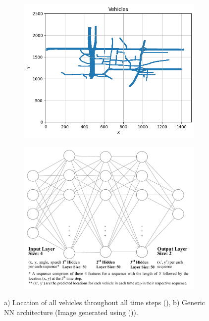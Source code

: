 \documentclass[journal,onecolumn]{IEEEtran}
\begin{document}
{\begin{appendices}
\begin{figure}[H]
    \centering
    \begin{subfigure}[b]{0.46\linewidth}
        \centering
        \includegraphics[width=\linewidth]{figures/location.png}
        \caption{}
        \label{fig:location}
    \end{subfigure}%
    \begin{subfigure}[b]{0.54\linewidth}
        \centering
        \includegraphics[width=\linewidth]{figures/architecture.pdf}
        \caption{}
        \label{fig:nn-architecture}
    \end{subfigure}
    \caption{a) Location of all vehicles throughout all time steps (\cite{dataset20kumbhar}), b) Generic NN architecture (Image generated using (\cite{joss19lenail})).}
    \label{fig:side-by-side}
\end{figure}



\end{appendices}}
\end{document}
